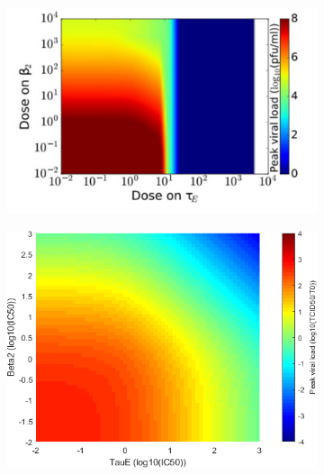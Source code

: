 \documentclass[a4paper,11pt]{article}
\begin{document}
\begin{figure}
\begin{subfigure}{0.4\textwidth}
    \includegraphics[width=\textwidth]{MBeta2TauEP.png}
    \end{subfigure}
    \begin{subfigure}{0.35\textwidth}

    \includegraphics[width=\textwidth]{Beta2TauE_peaks.png}
    \end{subfigure}

    \begin{subfigure}{0.4\textwidth}


\end{subfigure}
\end{figure}
\end{document}
